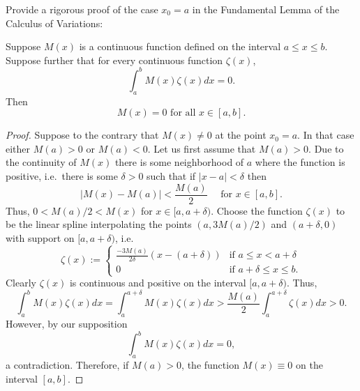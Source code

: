\begin{problem}
  Provide a rigorous proof of the case $x_0 = a$ in the Fundamental Lemma
  of the Calculus of Variations:

  \begin{theorem}
    Suppose $M(x)$ is a continuous function defined on the interval $a \leq x \leq b$.
    Suppose further that for every continuous function $\zeta(x)$,
    \[
      \int_a^b M(x)\zeta(x)dx = 0.
    \]
    Then
    \[
      M(x) = 0 \text{ for all $x\in [a,b]$.}
    \]
  \end{theorem}
\end{problem}

\begin{proof}
  Suppose to the contrary that $M(x) \neq 0$ at the point $x_0 = a$. In that case
  either $M(a) > 0$ or $M(a) < 0$. Let us first assume that $M(a) > 0$. Due to
  the continuity of $M(x)$ there is some neighborhood of $a$ where the function
  is positive, i.e.\ there is some $\delta > 0$ such that if $|x - a| < \delta$
  then
  $$|M(x) - M(a)| < \frac{M(a)}{2} \quad \text{ for $x \in [a,b]$}.$$
  Thus, $0 < M(a)/2 < M(x)$ for $x \in [a,a+\delta)$.
  Choose the function $\zeta(x)$ to be the linear spline interpolating
  the points $(a, 3M(a)/2)$ and $(a + \delta, 0)$ with support on $[a, a + \delta)$,
  i.e.\
  \[
    \zeta(x) :=
    \begin{cases}
      \frac{-3M(a)}{2\delta}(x - (a+\delta)) & \text{if $a \leq x < a + \delta$}\\
      0 & \text{if $a + \delta \leq x \leq b$}.
    \end{cases}
  \]
  Clearly $\zeta(x)$ is continuous and positive on the interval $[a, a + \delta)$.
  Thus,
  \[
    \int_a^b M(x) \zeta(x) dx = \int_a^{a+\delta} M(x) \zeta(x) dx > \frac{M(a)}{2} \int_a^{a+\delta}  \zeta(x) dx > 0.
  \]
  However, by our supposition
  \[
    \int_a^b M(x) \zeta(x) dx = 0,
  \]
  a contradiction. Therefore, if $M(a) > 0$, the function $M(x) \equiv 0$ on
  the interval $[a, b]$.


\end{proof}
